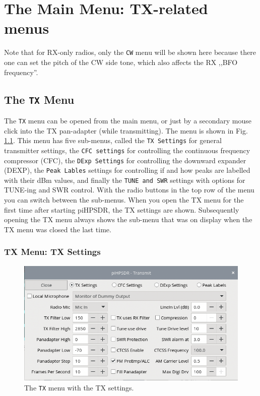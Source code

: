 \documentclass[12pt]{book}
\def\rett#1{\texttt{\color{red}#1}}
\def\bltt#1{\texttt{\color{blue}#1}}
\def\pH{pi\-HPSDR\xspace}
\begin{document}
\chapter[TX-related menus]{The Main Menu: TX-related menus}

Note that for RX-only radios, only the \bltt{CW} menu will be shown here
because there one can set the pitch of the CW side tone, which also affects
the RX ,,BFO frequency''.


\section{The \texttt{TX} Menu}

The \bltt{TX} menu can be opened from the main menu, or just by a secondary mouse click
into the TX pan-adapter (while transmitting). The menu is shown in Fig. \ref{fig:TXMenu}.
This menu has five sub-menus, called the \rett{TX Settings} for general transmitter settings,
the \rett{CFC settings} for controlling the continuous frequency compressor (CFC),  the
\rett{DExp Settings} for controlling the downward expander (DEXP),  the \rett{Peak Lables}
settings for controlling if and how peaks are labelled with their dBm values,
and finally the \rett{TUNE and SWR} settings with options for TUNE-ing and SWR control.
With the radio buttons
in the top row of the menu you can switch between the sub-menus. When you open the TX
menu for the first time after starting \pH, the TX settings are shown. Subsequently opening
the TX menu always shows the sub-menu that was on display when the TX  menu was closed the last
time.

\subsection{TX Menu: TX Settings}


\label{sec:txmenu}
\begin{figure}[ht!]
\center
\includegraphics[scale=0.45]{TXMenu.png}
\caption{The \bltt{TX} menu with the TX settings.}
\label{fig:TXMenu}
\end{figure}
\end{document}
